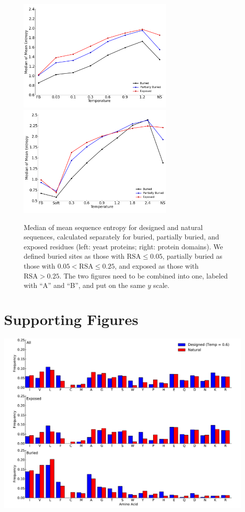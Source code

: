\documentclass[12pt]{article}
\begin{document}
\begin{figure}[H]
\centerline{\includegraphics[width = 3in]{figures/Mean_Entropy_Position_Lineplot.png}\includegraphics[width = 3in]{figures/Mean_Entropy_Position_Lineplot_Noah.png}}
\caption{Median of mean sequence entropy for designed and natural sequences, calculated separately for buried, partially buried, and exposed residues (left: yeast proteins; right: protein domains). We defined buried sites as those with $\text{RSA}\leq 0.05$, partially buried as those with $0.05<\text{RSA}\leq0.25$, and exposed as those with $\text{RSA}>0.25$. {\color{red}The two figures need to be combined into one, labeled with ``A'' and ``B'', and put on the same $y$ scale.}}
\label{Mean_Entropy_Surface_Core}
\end{figure}



\cleardoublepage

\section{Supporting Figures}

\centerline{\includegraphics[width = 5in]{figures/Noah_Freq_Combo_Plots_06.pdf}}
\end{document}

